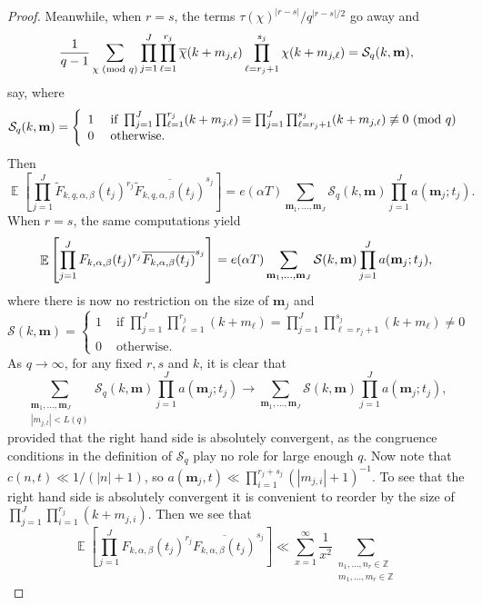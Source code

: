 \documentclass[12pt, a4paper]{amsart}
\theoremstyle{remark}
\newcommand{\Z}{\ensuremath{\mathbb{Z}}}
\newcommand{\abs}[1]{\left|#1\right|}
\renewcommand{\mod}[1]{{\ifmmode\text{\rm\ (mod~$#1$)}\else\discretionary{}{}{\hbox{ }}\rm(mod~$#1$)\fi}}
\newcommand{\chibar}{\overline \chi}
\newcommand{\bm}{\mathbf{m}}
\newcommand{\cS}{\mathcal{S}}
\DeclareMathOperator{\E}{\mathbb{E}}
\begin{document}
\begin{proof}
Meanwhile, when $r=s$, the terms $\tau(\chi)^{|r-s|}/q^{|r-s|/2}$ go away and
\[
 \frac{1}{q-1}
 \sum_{\chi \mod q}
 \prod_{j=1}^J\prod_{\ell=1}^{r_j}\chibar(k + m_{j,\ell})
 \prod_{\ell=r_j + 1}^{s_j}\chi(k + m_{j,\ell})
 = \cS_q(k, \bm),
\]
say, where
\[
 \cS_q(k, \bm) =
 \left\{
 \begin{array}{ll}
     1 & \textrm{ if } 
     \prod_{j=1}^J\prod_{\ell=1}^{r_j}(k + m_{j, \ell}) \equiv
     \prod_{j=1}^J\prod_{\ell=r_j + 1}^{s_j}(k + m_{j, \ell})  \not \equiv 0 \mod q\\
     0 & \textrm{ otherwise.}
 \end{array}
 \right.
\]
Then
\[
\E \left[ \prod_{j=1}^J \tilde F_{k,q,\alpha,\beta}(t_j)^{r_j} \overline{\tilde F_{k,q,\alpha,\beta}(t_j)}^{s_j} \right] =
    e(\alpha T)
 \sum_{\bm_1, \dots, \bm_J}\cS_q(k, \bm)
 \prod_{j=1}^J a(\bm_j; t_j)
 .
\]
When $r=s$, the same computations yield
\[
\E \left[ \prod_{j=1}^J F_{k,\alpha,\beta}(t_j)^{r_j} \overline{F_{k,\alpha,\beta}(t_j)}^{s_j} \right] = \\
    e(\alpha T)
 \sum_{\bm_1, \dots, \bm_J} \cS(k, \bm)
 \prod_{j=1}^J a(\bm_j; t_j)
,
\]
where there is now no restriction on the size of $\bm_j$ and
\[
 \cS(k, \bm) =
 \left\{
 \begin{array}{ll}
     1 & \textrm{ if } 
     \prod_{j=1}^J\prod_{\ell=1}^{r_j}(k + m_{\ell}) =
     \prod_{j=1}^J\prod_{\ell=r_j + 1}^{s_j}(k + m_{\ell}) \ne 0 \\
     0 & \textrm{ otherwise.}
 \end{array}
 \right.
\]
As $q \rightarrow \infty$, for any fixed $r, s$ and $k$, it is clear that
\[
 \sum_{
     \substack{\bm_1, \dots, \bm_J \\ \abs{m_{j,l}} < L(q) }
    } \cS_q(k, \bm)
 \prod_{j=1}^J a(\bm_j; t_j)
 \longrightarrow
 \sum_{\bm_1, \dots, \bm_J}\cS(k, \bm)
 \prod_{j=1}^J a(\bm_j; t_j)
 ,
\]
provided that the right hand side is absolutely convergent, as the congruence
conditions in the definition of $\cS_q$ play no role for large enough $q$.
Now note that $c(n,t) \ll 1/(\abs{n} + 1)$, so $a(\bm_j, t) \ll
\prod_{i=1}^{r_j + s_j} (\abs{m_{j,i}} + 1)^{-1}$.
To see that the right hand side is absolutely convergent it is convenient to
reorder by the size of $\prod_{j=1}^{J}\prod_{i=1}^{r_j} (k + m_{j,i})$. Then
we see that
\begin{equation}\label{eg:moment-divisor-bound}
\E \left[ \prod_{j=1}^J F_{k,\alpha,\beta}(t_j)^{r_j} \overline{F_{k,\alpha,\beta}(t_j)}^{s_j} \right]
    \ll \sum_{x = 1}^\infty \frac{1}{x^2}
    \sum_{\substack{n_1, \ldots, n_r \in \Z \\ m_1, \ldots, m_r \in \Z
}}
\end{equation}
\end{proof}
\end{document}
